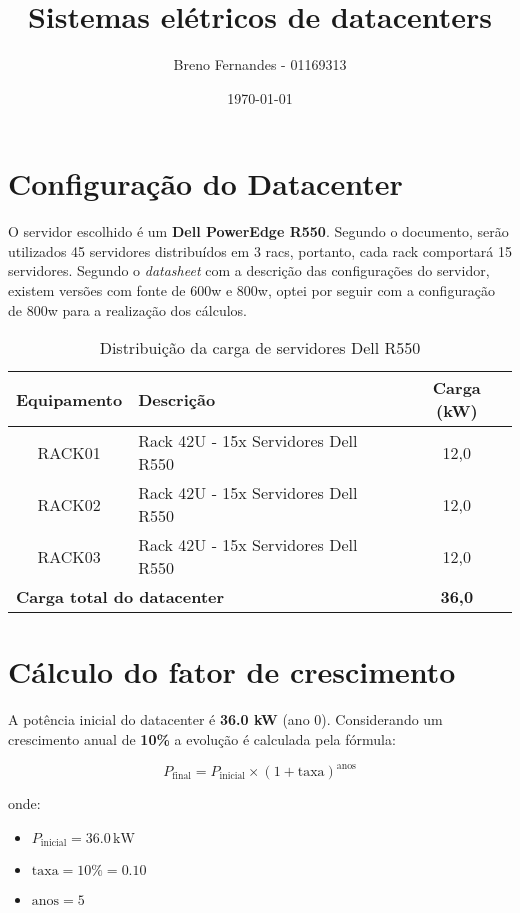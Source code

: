 \documentclass[12pt]{article}
\title{Sistemas elétricos de datacenters}
\author{Breno Fernandes - 01169313}
\date{\today}
\begin{document}
\maketitle

\section*{Configuração do Datacenter}
O servidor escolhido é um \textbf{Dell PowerEdge R550}. Segundo o documento, serão utilizados 45 servidores distribuídos em 3 racs, portanto, cada rack comportará 15 servidores.
Segundo o \textit{datasheet} com a descrição das configurações do servidor, existem versões com fonte de 600w e 800w, optei por seguir com a configuração de 800w para a realização dos cálculos.

\renewcommand{\arraystretch}{1.3}
\begin{table}[h]
    \centering
    \begin{tabular}{|c|l|c|}
        \hline
        \textbf{Equipamento} & \textbf{Descrição} & \textbf{Carga (kW)} \\
        \hline
        RACK01 & Rack 42U - 15x Servidores Dell R550 & 12,0 \\
        \hline
        RACK02 & Rack 42U - 15x Servidores Dell R550 & 12,0 \\
        \hline
        RACK03 & Rack 42U - 15x Servidores Dell R550 & 12,0 \\
        \hline
        \multicolumn{2}{|l|}{\textbf{Carga total do datacenter}} & \textbf{36,0} \\
        \hline
    \end{tabular}
    \caption{Distribuição da carga de servidores Dell R550}
\end{table}

\section*{Cálculo do fator de crescimento}
A potência inicial do datacenter é \textbf{36.0 kW} (ano 0). Considerando um crescimento anual de \textbf{10\%} a evolução é calculada pela fórmula:

\[
P_{\text{final}} = P_{\text{inicial}} \times (1 + \text{taxa})^{\text{anos}}
\]

\noindent onde:
\begin{itemize}
    \item \( P_{\text{inicial}} = 36.0 \, \text{kW} \)
    \item \( \text{taxa} = 10\% = 0.10 \)
    \item \( \text{anos} = 5 \)
\end{itemize}
\end{document}

